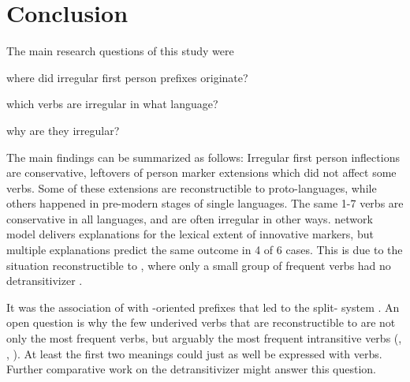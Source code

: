 \section{Conclusion}
\label{sec:discussion}
The main research questions of this study were 
\begin{inlinelistplain}
	\item where did irregular first person prefixes originate?
	\item which verbs are irregular in what language?
	\item why are they irregular?
\end{inlinelistplain}
The main findings can be summarized as follows:
Irregular first person inflections are conservative, leftovers of person marker extensions which did not affect some verbs.
Some of these extensions are reconstructible to proto-languages, while others happened in pre-modern stages of single languages.
The same 1-7 verbs are conservative in all languages, and are often irregular in other ways.
 network model delivers explanations for the lexical extent of innovative markers, but multiple explanations predict the same outcome in 4 of 6 cases.
This is due to the situation reconstructible to \PC, where only a small group of frequent  verbs had no detransitivizer \detrz.

It was the association of \detrz with -oriented prefixes that led to the split- system \parencite{meira2000split}.
An open question is why the few underived  verbs that are reconstructible to \PC are not only the most frequent  verbs, but arguably the most frequent intransitive verbs (, , ).
At least the first two meanings could just as well be expressed with  verbs.
Further comparative work on the detransitivizer might answer this question.


